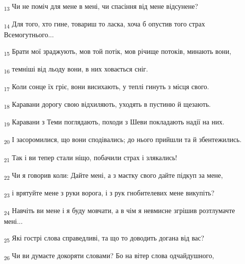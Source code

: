 \begin{tcolorbox}
\textsubscript{13} Чи не поміч для мене в мені, чи спасіння від мене відсунене?
\end{tcolorbox}
\begin{tcolorbox}
\textsubscript{14} Для того, хто гине, товариш то ласка, хоча б опустив того страх Всемогутнього...
\end{tcolorbox}
\begin{tcolorbox}
\textsubscript{15} Брати мої зраджують, мов той потік, мов річище потоків, минають вони,
\end{tcolorbox}
\begin{tcolorbox}
\textsubscript{16} темніші від льоду вони, в них ховається сніг.
\end{tcolorbox}
\begin{tcolorbox}
\textsubscript{17} Коли сонце їх гріє, вони висихають, у теплі гинуть з місця свого.
\end{tcolorbox}
\begin{tcolorbox}
\textsubscript{18} Каравани дорогу свою відхиляють, уходять в пустиню й щезають.
\end{tcolorbox}
\begin{tcolorbox}
\textsubscript{19} Каравани з Теми поглядають, походи з Шеви покладають надії на них.
\end{tcolorbox}
\begin{tcolorbox}
\textsubscript{20} І засоромилися, що вони сподівались; до нього прийшли та й збентежились.
\end{tcolorbox}
\begin{tcolorbox}
\textsubscript{21} Так і ви тепер стали ніщо, побачили страх і злякались!
\end{tcolorbox}
\begin{tcolorbox}
\textsubscript{22} Чи я говорив коли: Дайте мені, а з маєтку свого дайте підкуп за мене,
\end{tcolorbox}
\begin{tcolorbox}
\textsubscript{23} і врятуйте мене з руки ворога, і з рук гнобителевих мене викупіть?
\end{tcolorbox}
\begin{tcolorbox}
\textsubscript{24} Навчіть ви мене і я буду мовчати, а в чім я невмисне згрішив розтлумачте мені...
\end{tcolorbox}
\begin{tcolorbox}
\textsubscript{25} Які гострі слова справедливі, та що то доводить догана від вас?
\end{tcolorbox}
\begin{tcolorbox}
\textsubscript{26} Чи ви думаєте докоряти словами? Бо на вітер слова одчайдушного,
\end{tcolorbox}
